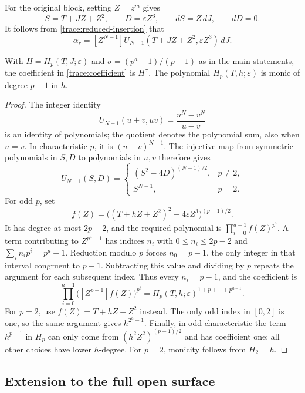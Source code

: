 For the original block, setting $Z=z^m$ gives
\[
 S=T+JZ+Z^2,\qquad D=\varepsilon Z^3,
 \qquad dS=Z\,dJ,\qquad dD=0.
\]
It follows from \eqref{trace:reduced-insertion} that
\begin{equation}
 \bar\alpha_r=
 [Z^{N-1}]U_{N-1}(T+JZ+Z^2,\varepsilon Z^3)\,dJ.
 \label{trace:coefficient}
\end{equation}

\begin{lemma}
\label{trace:residue}
With $H=H_p(T,J;\varepsilon)$ and $\sigma=(p^a-1)/(p-1)$ as in the
main statements, the coefficient in \eqref{trace:coefficient} is $H^\sigma$.
The polynomial $H_p(T,h;\varepsilon)$ is monic of degree $p-1$ in $h$.
\end{lemma}

\begin{proof}
The integer identity
\[
 U_{N-1}(u+v,uv)=\frac{u^N-v^N}{u-v}
\]
is an identity of polynomials; the quotient denotes the polynomial sum,
also when $u=v$. In characteristic $p$, it is $(u-v)^{N-1}$.
The injective map from symmetric polynomials in $S,D$ to polynomials
in $u,v$ therefore gives
\[
 U_{N-1}(S,D)=
 \begin{cases}
 (S^2-4D)^{(N-1)/2},&p\ne2,\\
 S^{N-1},&p=2.
 \end{cases}
\]
For odd $p$, set
\[
 f(Z)=\bigl((T+hZ+Z^2)^2-4\varepsilon Z^3\bigr)^{(p-1)/2}.
\]
It has degree at most $2p-2$, and the required polynomial is
$\prod_{i=0}^{a-1}f(Z)^{p^i}$. A term contributing to $Z^{p^a-1}$
has indices $n_i$ with $0\le n_i\le2p-2$ and
$\sum_i n_i p^i=p^a-1$. Reduction modulo $p$ forces $n_0=p-1$,
the only integer in that interval congruent to $p-1$.
Subtracting this value and dividing by $p$ repeats the argument for
each subsequent index. Thus every $n_i=p-1$, and the coefficient is
\[
 \prod_{i=0}^{a-1}\bigl([Z^{p-1}]f(Z)\bigr)^{p^i}
 =H_p(T,h;\varepsilon)^{1+p+\cdots+p^{a-1}}.
\]
For $p=2$, use $f(Z)=T+hZ+Z^2$ instead. The only odd index in
$[0,2]$ is one, so the same argument gives $h^{2^a-1}$.
Finally, in odd characteristic the term $h^{p-1}$ in $H_p$ can only
come from $(h^2Z^2)^{(p-1)/2}$ and has coefficient one; all other
choices have lower $h$-degree. For $p=2$, monicity follows from $H_2=h$.
\end{proof}

\subsection{Extension to the full open surface}

